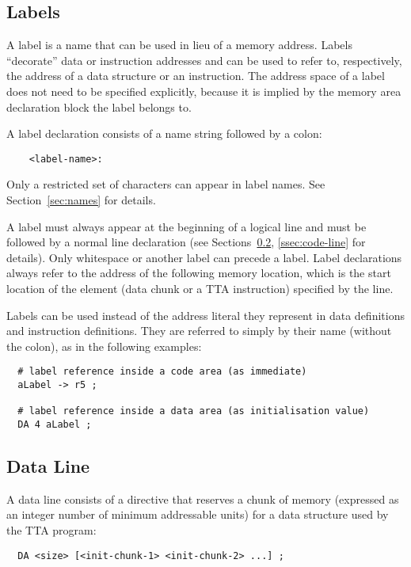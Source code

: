 \documentclass[twoside]{tceusermanual}
\begin{document}
\subsection{Labels}
\label{ssec:labels}

A label is a name that can be used in lieu of a memory address.  Labels
``decorate'' data or instruction addresses and can be used to refer to,
respectively, the address of a data structure or an instruction.
%
The address space of a label does not need to be specified explicitly,
because it is implied by the memory area declaration block the label belongs
to.

A label declaration consists of a name string followed by a colon:

\begin{verbatim}
    <label-name>:
\end{verbatim}

Only a restricted set of characters can appear in label names. See
Section~\ref{sec:names} for details.

A label must always appear at the beginning of a logical line and must be
followed by a normal line declaration (see Sections~\ref{ssec:data-line},
\ref{ssec:code-line} for details). Only whitespace or another label can
precede a label. Label declarations always refer to the address of the
following memory location, which is the start location of the element (data
chunk or a TTA instruction) specified by the line.

Labels can be used instead of the address literal they represent in data
definitions and instruction definitions. They are referred to simply by
their name (without the colon), as in the following examples:
\begin{verbatim}
  # label reference inside a code area (as immediate)
  aLabel -> r5 ;

  # label reference inside a data area (as initialisation value)
  DA 4 aLabel ;
\end{verbatim}

\subsection{Data Line}
\label{ssec:data-line}

A data line consists of a directive that reserves a chunk of memory
(expressed as an integer number of minimum addressable units) for a data
structure used by the TTA program:

\begin{verbatim}
  DA <size> [<init-chunk-1> <init-chunk-2> ...] ;
\end{verbatim}
\end{document}
